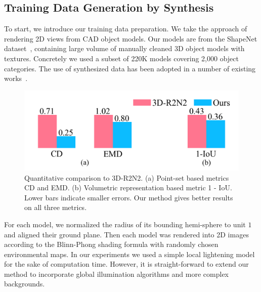 \subsection{Training Data Generation by Synthesis}
\label{sec:exp:traindata}
To start, we introduce our training data preparation. We take the approach of rendering 2D views from CAD object models. %
Our models are from the ShapeNet dataset~\cite{shapenet2015}, containing large volume of manually cleaned 3D object models with textures. Concretely we used a subset of 220K models covering 2,000 object categories. The use of synthesized data has been adopted in a number of existing works~\cite{choy20163d,rezende2016unsupervised}.

\begin{figure}[t!]
  \centering
  \includegraphics[width=0.9\linewidth]{./fig/iou_bar}
  \caption{Quantitative comparison to 3D-R2N2. (a) Point-set based metrics CD and EMD. (b) Volumetric representation based metric 1 - IoU. Lower bars indicate smaller errors. Our method gives better results on all three metrics. }\label{fig:comparison}
\end{figure}
For each model, we normalized the radius of its bounding hemi-sphere to unit $1$ and aligned their ground plane. Then each model was rendered into 2D images according to the Blinn-Phong shading formula with randomly chosen environmental maps. In our experiments we used a simple local lightening model for the sake of computation time. However, it is straight-forward to extend our method to incorporate global illumination algorithms and more complex backgrounds. %


